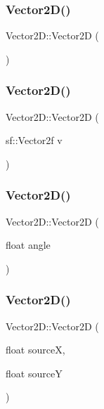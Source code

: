 \subsubsection{\texorpdfstring{Vector2\+D()}{Vector2D()}\hspace{0.1cm}{\footnotesize\ttfamily [1/5]}}
{\footnotesize\ttfamily Vector2\+D\+::\+Vector2D (\begin{DoxyParamCaption}{ }\end{DoxyParamCaption})}

\hypertarget{class_vector2_d_a98cb7602bcb90bbb11b6bb99b3647f1a}{}\label{class_vector2_d_a98cb7602bcb90bbb11b6bb99b3647f1a} 
\subsubsection{\texorpdfstring{Vector2\+D()}{Vector2D()}\hspace{0.1cm}{\footnotesize\ttfamily [2/5]}}
{\footnotesize\ttfamily Vector2\+D\+::\+Vector2D (\begin{DoxyParamCaption}\item[{sf\+::\+Vector2f}]{v }\end{DoxyParamCaption})}

\hypertarget{class_vector2_d_ac8545dc4359145ab643ccc88758c9162}{}\label{class_vector2_d_ac8545dc4359145ab643ccc88758c9162} 
\subsubsection{\texorpdfstring{Vector2\+D()}{Vector2D()}\hspace{0.1cm}{\footnotesize\ttfamily [3/5]}}
{\footnotesize\ttfamily Vector2\+D\+::\+Vector2D (\begin{DoxyParamCaption}\item[{float}]{angle }\end{DoxyParamCaption})}

\hypertarget{class_vector2_d_aadcb679a8c3fd6eaad3418d9df5f7529}{}\label{class_vector2_d_aadcb679a8c3fd6eaad3418d9df5f7529} 
\subsubsection{\texorpdfstring{Vector2\+D()}{Vector2D()}\hspace{0.1cm}{\footnotesize\ttfamily [4/5]}}
{\footnotesize\ttfamily Vector2\+D\+::\+Vector2D (\begin{DoxyParamCaption}\item[{float}]{sourceX,  }\item[{float}]{sourceY }\end{DoxyParamCaption})}

